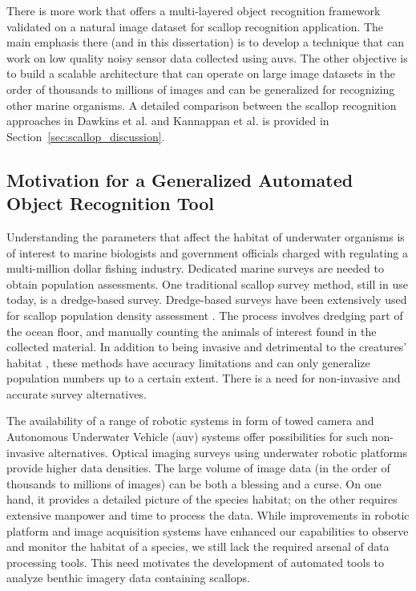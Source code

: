 \documentclass {udthesis}
\begin{document}
There is more work \cite{prasanna_med, prasanna_aslo, prasanna_igi} that offers a multi-layered object recognition framework validated on
a natural image dataset for scallop recognition application. 
The main emphasis there (and in this dissertation) is to develop a technique that can work on low quality noisy sensor data collected using \gls{auv}s.
The other objective is to build a scalable architecture that can operate on 
large image datasets in the order of thousands to millions of images
and can be generalized for recognizing other marine organisms.
A detailed comparison between the scallop recognition approaches in Dawkins et al. \cite{dawkings13} and Kannappan et al.\cite{prasanna_igi} is provided in Section~\ref{sec:scallop_discussion}.


\subsection{Motivation for a Generalized Automated Object Recognition Tool}

Understanding the parameters that affect the habitat of underwater organisms is of interest to marine
biologists and government officials charged with regulating a multi-million dollar fishing industry. Dedicated
marine surveys are needed to obtain population assessments. One traditional scallop survey method, still
in use today,  is a dredge-based survey. Dredge-based surveys have been extensively used for scallop population density
assessment \cite{nefsc}. The process involves dredging part of the ocean floor, and manually counting the
animals of interest found in the collected material. In addition to being invasive and
detrimental to the creatures’ habitat \cite{jenkins}, these methods have accuracy
limitations and can only generalize population numbers up to a certain extent.
There is a need for non-invasive and accurate survey alternatives.

The availability of a range of robotic systems in form of towed camera and Autonomous Underwater Vehicle
(auv) systems offer possibilities for such non-invasive alternatives. Optical imaging surveys using underwater
robotic platforms provide higher data densities. The large volume of image data (in the order of thousands
to millions of images) can be both a blessing and a curse. On one hand, it provides a detailed picture of
the species habitat; on the other requires extensive manpower and time to process the data.
While improvements in robotic platform and image acquisition systems have enhanced our capabilities to
observe and monitor the habitat of a species, we still lack the required arsenal of data processing tools. This
need motivates the development of automated tools to analyze benthic imagery data containing scallops.
\end{document}
